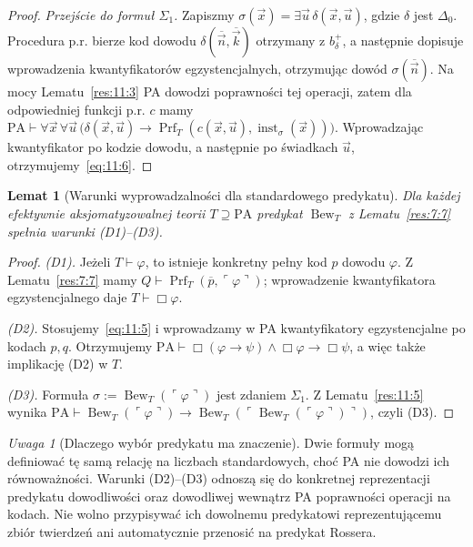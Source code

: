 \documentclass[11pt,a4paper]{article}
\numberwithin{equation}{section}
\newcommand{\PA}{\mathrm{PA}}
\theoremstyle{plain}
\newtheorem{lemat}[twierdzenie]{Lemat}
\theoremstyle{definition}
\theoremstyle{remark}
\newtheorem{uwaga}[twierdzenie]{Uwaga}
\begin{document}
\begin{proof}
\emph{Przejście do formuł $\Sigma_1$.} Zapiszmy $\sigma(\vec x)=\exists\vec u\,\delta(\vec x,\vec u)$, gdzie $\delta$ jest $\Delta_0$. Procedura p.r. bierze kod dowodu $\delta(\overline{\vec n},\overline{\vec k})$ otrzymany z $b_\delta^+$, a następnie dopisuje wprowadzenia kwantyfikatorów egzystencjalnych, otrzymując dowód $\sigma(\overline{\vec n})$. Na mocy Lematu~\ref{res:11:3} PA dowodzi poprawności tej operacji, zatem dla odpowiedniej funkcji p.r. $c$ mamy
$\PA\vdash\forall\vec x\,\forall\vec u\,\bigl(\delta(\vec x,\vec u)\to\operatorname{Prf}_T(c(\vec x,\vec u),\operatorname{inst}_\sigma(\vec x))\bigr)$.
Wprowadzając kwantyfikator po kodzie dowodu, a następnie po świadkach $\vec u$, otrzymujemy~\eqref{eq:11:6}.
\end{proof}

\begin{lemat}[Warunki wyprowadzalności dla standardowego predykatu]\label{res:11:6}
Dla każdej efektywnie aksjomatyzowalnej teorii $T\supseteq\PA$ predykat $\operatorname{Bew}_T$ z Lematu~\ref{res:7:7} spełnia warunki (D1)--(D3).
\end{lemat}
\begin{proof}
\emph{(D1).} Jeżeli $T\vdash\varphi$, to istnieje konkretny pełny kod $p$ dowodu $\varphi$. Z Lematu~\ref{res:7:7} mamy $Q\vdash\operatorname{Prf}_T(\overline p,\ulcorner\varphi\urcorner)$; wprowadzenie kwantyfikatora egzystencjalnego daje $T\vdash\Box\varphi$.

\emph{(D2).} Stosujemy~\eqref{eq:11:5} i wprowadzamy w PA kwantyfikatory egzystencjalne po kodach $p,q$. Otrzymujemy
$\PA\vdash\Box(\varphi\to\psi)\land\Box\varphi\to\Box\psi$, a więc także implikację (D2) w $T$.

\emph{(D3).} Formuła $\sigma:=\operatorname{Bew}_T(\ulcorner\varphi\urcorner)$ jest zdaniem $\Sigma_1$. Z Lematu~\ref{res:11:5} wynika
$\PA\vdash\operatorname{Bew}_T(\ulcorner\varphi\urcorner)\to
\operatorname{Bew}_T(\ulcorner\operatorname{Bew}_T(\ulcorner\varphi\urcorner)\urcorner)$,
czyli (D3).
\end{proof}

\begin{uwaga}[Dlaczego wybór predykatu ma znaczenie]\label{res:11:7}
Dwie formuły mogą definiować tę samą relację na liczbach standardowych, choć PA nie dowodzi ich równoważności. Warunki (D2)--(D3) odnoszą się do konkretnej reprezentacji predykatu dowodliwości oraz dowodliwej wewnątrz PA poprawności operacji na kodach. Nie wolno przypisywać ich dowolnemu predykatowi reprezentującemu zbiór twierdzeń ani automatycznie przenosić na predykat Rossera.
\end{uwaga}
\end{document}
